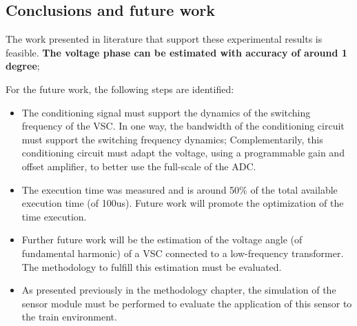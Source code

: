 \subsection{Conclusions and future work}
	The work presented in literature that support these experimental results is feasible. \textbf{The voltage phase can be estimated with accuracy of around 1 degree};
	
	For the future work, the following steps are identified:
	
	\begin{itemize}
		\setlength\itemsep{0em}
	
		\item The conditioning signal must support the dynamics of the switching frequency of the VSC. In one way, the bandwidth of the conditioning circuit must support the switching frequency dynamics; Complementarily, this conditioning circuit must adapt the voltage, using a programmable gain and offset amplifier, to better use the full-scale of the ADC.
		
		\item The execution time was measured and is around 50\% of the total available execution time (of 100us). Future work will promote the optimization of the time execution.
		
		
		\item Further future work will be the estimation of the voltage angle (of fundamental harmonic) of a VSC connected to a low-frequency transformer. The methodology to fulfill this estimation must be evaluated.
		
		\item As presented previously in the methodology chapter, the simulation of the sensor module must be performed to evaluate the application of this sensor to the train environment.
	\end{itemize}
